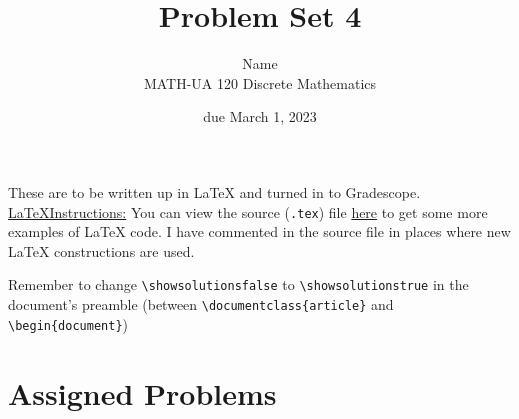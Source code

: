 \documentclass{article}
\title{Problem Set 4}
\author{%
    Name
\\  MATH-UA 120 Discrete Mathematics
}
\date{due March 1, 2023}
\newif\ifshowsolutions
\newcommand{\danger}{\marginpar[\hfill\dbend]{\dbend\hfill}}
\theoremstyle{definition}
\begin{document}
\maketitle



These are to be written up in \LaTeX{} and turned in to Gradescope.\\



\ifshowsolutions
    \SetupExSheets{solution/print=true}
\else
    \danger
 \underline{ \LaTeX  Instructions:}  You can view the source (\texttt{.tex}) file \href{}{here} to get some more examples of \LaTeX{} code.  I have commented in the source file in places where new \LaTeX{} constructions are used.
  
  Remember to change \verb|\showsolutionsfalse| to \verb|\showsolutionstrue|
    in the document's preamble 
    (between \verb|\documentclass{article}| and \verb|\begin{document}|)
\fi

\section*{Assigned Problems}
\end{document}
